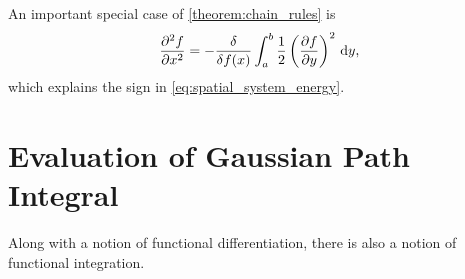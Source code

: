 An important special case of \cref{theorem:chain_rules} is
\begin{equation}
  \label{eq:derivative_of_squared_derivative}
  \pdv[2]{f}{x} = -\fdv{f(x)}\int_a^b \frac{1}{2}\left(\pdv{f}{y}\right)^2\,\mathrm{d}y,
\end{equation}
which explains the sign in \cref{eq:spatial_system_energy}.

\section{Evaluation of Gaussian Path Integral}
\label{sec:evaluation_of_integral}
Along with a notion of functional differentiation, there is also a notion of functional integration.